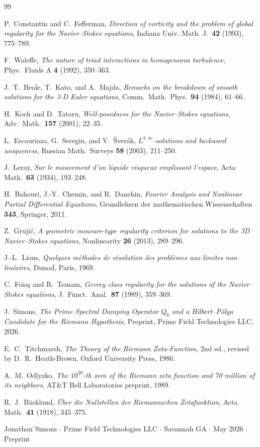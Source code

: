 \documentclass[11pt]{article}
\begin{document}
\begin{thebibliography}{99}

P.~Constantin and C.~Fefferman,
\textit{Direction of vorticity and the problem of global regularity for the Navier--Stokes equations},
Indiana Univ. Math. J.\ \textbf{42} (1993), 775--789.

F.~Waleffe,
\textit{The nature of triad interactions in homogeneous turbulence},
Phys.\ Fluids A \textbf{4} (1992), 350--363.

J.~T.~Beale, T.~Kato, and A.~Majda,
\textit{Remarks on the breakdown of smooth solutions for the 3-D Euler equations},
Comm.\ Math.\ Phys.\ \textbf{94} (1984), 61--66.

H.~Koch and D.~Tataru,
\textit{Well-posedness for the Navier--Stokes equations},
Adv.\ Math.\ \textbf{157} (2001), 22--35.

L.~Escauriaza, G.~Seregin, and V.~\v{S}ver\'{a}k,
\textit{$L^{3,\infty}$-solutions and backward uniqueness},
Russian Math.\ Surveys \textbf{58} (2003), 211--250.

J.~Leray,
\textit{Sur le mouvement d'un liquide visqueux emplissant l'espace},
Acta Math.\ \textbf{63} (1934), 193--248.

H.~Bahouri, J.-Y.~Chemin, and R.~Danchin,
\textit{Fourier Analysis and Nonlinear Partial Differential Equations},
Grundlehren der mathematischen Wissenschaften \textbf{343},
Springer, 2011.

Z.~Gruji\'{c},
\textit{A geometric measure-type regularity criterion for solutions
to the 3D Navier--Stokes equations},
Nonlinearity \textbf{26} (2013), 289--296.

J.-L.~Lions,
\textit{Quelques m\'ethodes de r\'esolution des probl\`emes aux limites non lin\'eaires},
Dunod, Paris, 1969.

C.~Foia\c{s} and R.~Temam,
\textit{Gevrey class regularity for the solutions of the Navier--Stokes equations},
J.\ Funct.\ Anal.\ \textbf{87} (1989), 359--369.


J.~Simons,
\textit{The Prime Spectral Damping Operator $Q_6$ and a Hilbert--P\'olya
Candidate for the Riemann Hypothesis},
Preprint, Prime Field Technologies LLC, 2026.

E.~C.~Titchmarsh,
\textit{The Theory of the Riemann Zeta-Function},
2nd ed., revised by D.~R.~Heath-Brown, Oxford University Press, 1986.

A.~M.~Odlyzko,
\textit{The $10^{20}$-th zero of the Riemann zeta function and 70 million
of its neighbors},
AT\&T Bell Laboratories preprint, 1989.

R.~J.~B\"acklund,
\textit{\"Uber die Nullstellen der Riemannschen Zetafunktion},
Acta Math.\ \textbf{41} (1918), 345--375.

\end{thebibliography}

\vfill
\begin{center}
{\small Jonathan Simons $\cdot$ Prime Field Technologies LLC $\cdot$ Savannah GA
$\cdot$ May 2026 $\cdot$ Preprint}
\end{center}
\end{document}
